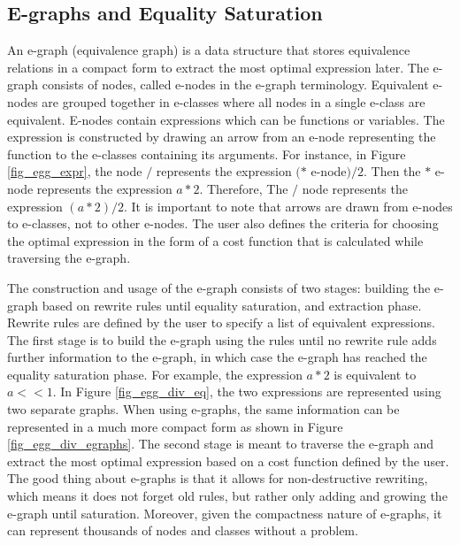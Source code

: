 \subsection{E-graphs and Equality Saturation}
An e-graph (equivalence graph) is a data structure that stores equivalence relations in a compact form to extract the most optimal expression later.
The e-graph consists of nodes, called e-nodes in the e-graph terminology. 
Equivalent e-nodes are grouped together in e-classes where all nodes in a single e-class are equivalent. 
E-nodes contain expressions which can be functions or variables.
The expression is constructed by drawing an arrow from an e-node representing the function to the e-classes containing its arguments. 
For instance, in Figure \ref{fig_egg_expr},  the node $/$ represents the expression $(*$ e-node$)/2$. Then the $*$ e-node represents the expression $a*2$. 
Therefore, The $/$ node represents the expression $(a*2)/2$. 
It is important to note that arrows are drawn from e-nodes to e-classes, not to other e-nodes.
The user also defines the criteria for choosing the optimal expression in the form of a cost function that is calculated while traversing the e-graph.

The construction and usage of the e-graph consists of two stages: building the e-graph based on rewrite rules until equality saturation, and extraction phase.
Rewrite rules are defined by the user to specify a list of equivalent expressions.
The first stage is to build the e-graph using the rules until no rewrite rule adds further information to the e-graph, in which case the e-graph has reached the equality saturation phase. 
For example, the expression $a*2$ is equivalent to $a <<1$.
In Figure \ref{fig_egg_div_eq}, the two expressions are represented using two separate graphs. 
When using e-graphs, the same information can be represented in a much more compact form as shown in Figure \ref{fig_egg_div_egraphs}. 
The second stage is meant to traverse the e-graph and extract the most optimal expression based on a cost function defined by the user. 
The good thing about e-graphs is that it allows for non-destructive rewriting, which means it does not forget old rules, but rather only adding and growing the e-graph until saturation. 
Moreover, given the compactness nature of e-graphs, it can represent thousands of nodes and classes without a problem.  

